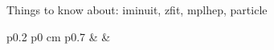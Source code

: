 \documentclass[aspectratio=169]{beamer}
\begin{document}
\begin{frame}{Things to know about: iminuit, zfit, mplhep, particle}
\begin{tabular}{p{0.2\linewidth} p{0 cm} p{0.7\linewidth}}
 & &  \\

\end{tabular}
\end{frame}
\end{document}
